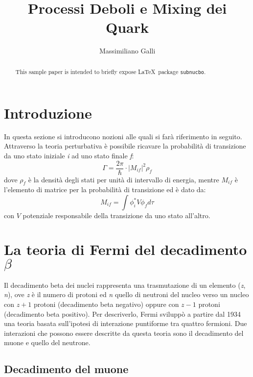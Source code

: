 \documentclass{subnucbo}
\title{Processi Deboli e Mixing dei Quark}
\author{Massimiliano Galli}
\begin{document}
\maketitle

\begin{abstract}
This sample paper is intended to briefly expose \LaTeX\ package \texttt{subnucbo}.
\end{abstract}

\section{Introduzione}
In questa sezione si introducono nozioni alle quali si farà riferimento in seguito.\\
Attraverso la teoria perturbativa è possibile ricavare la probabilità di transizione da uno stato iniziale \textit{i} ad uno stato finale \textit{f}:
\begin{equation}
        \Gamma = \frac{2 \pi} {\hbar} \cdot | M_{if}|^{2} \rho_{f}
        \label{eq:decay_rate}
\end{equation}
dove $\rho_{f}$ è la densità degli stati per unità di intervallo di energia, mentre $M_{if}$ è l'elemento di matrice per la probabilità di transizione ed è dato da:
\begin{equation}
        M_{if} = \int \phi^{*}_{i} V \phi_{f} d\tau
        \label{eq:matrix_element}
\end{equation}
con $V$ potenziale responsabile della transizione da uno stato all'altro.

\section{La teoria di Fermi del decadimento $\beta$}
Il decadimento beta dei nuclei rappresenta una trasmutazione di un elemento (\textit{z}, \textit{n}), ove \textit{z} è il numero di protoni ed \textit{n} quello di neutroni del nucleo verso un nucleo con $\textit{z} + 1$ protoni (decadimento beta negativo) oppure con $\textit{z} - 1$ protoni (decadimento beta positivo). Per descriverlo, Fermi sviluppò a partire dal 1934 una teoria basata sull'ipotesi di interazione puntiforme tra quattro fermioni. Due interazioni che possono essere descritte da questa teoria sono il decadimento del muone e quello del neutrone.

\subsection{Decadimento del muone}
\end{document}
